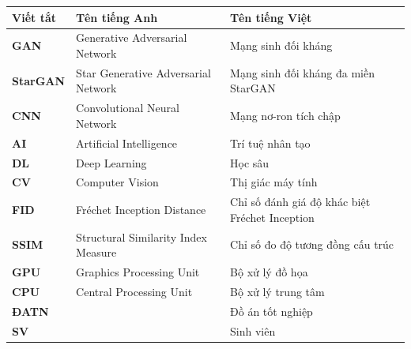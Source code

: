 \documentclass[../DoAn.tex]{subfiles}
\begin{document}
\begin{longtable}{l p{6cm} p{7cm}}
	\hline
   \textbf{Viết tắt}  & \textbf{Tên tiếng Anh}	& \textbf{Tên tiếng Việt} \\ \hline 
	\textbf{GAN} & Generative Adversarial Network & Mạng sinh đối kháng \\
	\textbf{StarGAN} & Star Generative Adversarial Network & Mạng sinh đối kháng đa miền StarGAN \\
	\textbf{CNN} & Convolutional Neural Network & Mạng nơ-ron tích chập \\
	\textbf{AI} & Artificial Intelligence & Trí tuệ nhân tạo \\
	\textbf{DL} & Deep Learning & Học sâu \\
	\textbf{CV} & Computer Vision & Thị giác máy tính \\
	\textbf{FID} & Fréchet Inception Distance & Chỉ số đánh giá độ khác biệt Fréchet Inception \\
	\textbf{SSIM} & Structural Similarity Index Measure & Chỉ số đo độ tương đồng cấu trúc \\
	\textbf{GPU} & Graphics Processing Unit & Bộ xử lý đồ họa \\
	\textbf{CPU} & Central Processing Unit & Bộ xử lý trung tâm \\
	\textbf{ĐATN} &  & Đồ án tốt nghiệp \\
	\textbf{SV} &  & Sinh viên \\
    \hline
\end{longtable}
\end{document}
